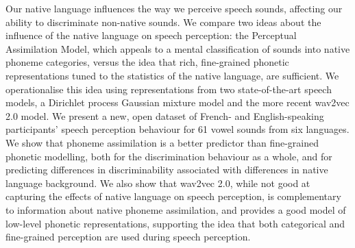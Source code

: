 Our native language influences the way we perceive speech sounds, affecting our ability to discriminate non-native sounds. We compare two ideas about the influence of the native language on speech perception: the Perceptual Assimilation Model, which appeals to a mental classification of sounds into native phoneme categories, versus the idea that rich, fine-grained phonetic representations tuned to the statistics of the native language, are sufficient. We operationalise this idea using representations from two state-of-the-art speech models, a Dirichlet process Gaussian mixture model and the more recent wav2vec 2.0 model. We present a new, open dataset of French- and English-speaking participants' speech perception behaviour for 61 vowel sounds from six languages. We show that phoneme assimilation is a better predictor than fine-grained phonetic modelling, both for the discrimination behaviour as a whole, and for predicting differences in discriminability associated with differences in native language background. We also show that wav2vec 2.0, while not good at capturing the effects of native language on speech perception, is complementary to information about native phoneme assimilation, and provides a good model of low-level phonetic representations, supporting the idea that both categorical and fine-grained perception are used during speech perception.

